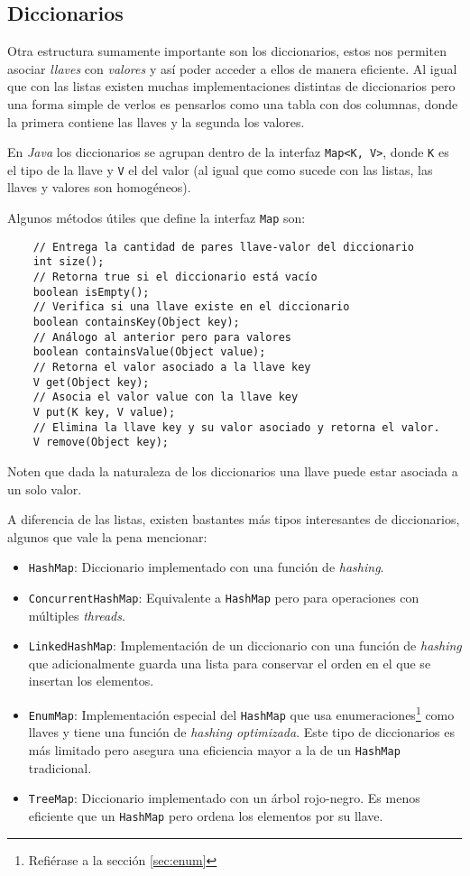 \subsection{Diccionarios}
  Otra estructura sumamente importante son los diccionarios, estos nos permiten asociar 
  \textit{llaves} con \textit{valores} y así poder acceder a ellos de manera eficiente.
  Al igual que con las listas existen muchas implementaciones distintas de diccionarios pero una
  forma simple de verlos es pensarlos como una tabla con dos columnas, donde la primera contiene las
  llaves y la segunda los valores.

  En \textit{Java} los diccionarios se agrupan dentro de la interfaz \texttt{Map<K, V>},
  donde \texttt{K} es el tipo de la llave y \texttt{V} el del valor (al igual que como sucede con 
  las listas, las llaves y valores son homogéneos).

  Algunos métodos útiles que define la interfaz \texttt{Map} son:
  \begin{verbatim}
    // Entrega la cantidad de pares llave-valor del diccionario
    int size();
    // Retorna true si el diccionario está vacío
    boolean isEmpty();
    // Verifica si una llave existe en el diccionario
    boolean containsKey(Object key);
    // Análogo al anterior pero para valores
    boolean containsValue(Object value);
    // Retorna el valor asociado a la llave key
    V get(Object key);
    // Asocia el valor value con la llave key
    V put(K key, V value);
    // Elimina la llave key y su valor asociado y retorna el valor.
    V remove(Object key);
  \end{verbatim}

  Noten que dada la naturaleza de los diccionarios una llave puede estar asociada a un solo valor.

  A diferencia de las listas, existen bastantes más tipos interesantes de diccionarios, algunos que
  vale la pena mencionar:
  \begin{itemize}
    \item \texttt{HashMap}: Diccionario implementado con una función de \textit{hashing}.
    \item \texttt{ConcurrentHashMap}: Equivalente a \texttt{HashMap} pero para operaciones con 
      múltiples \textit{threads}.
    \item \texttt{LinkedHashMap}: Implementación de un diccionario con una función de 
      \textit{hashing} que adicionalmente guarda una lista para conservar el orden en el que se 
      insertan los elementos.
    \item \texttt{EnumMap}: Implementación especial del \texttt{HashMap} que usa 
      enumeraciones\footnote{Refiérase a la sección \ref{sec:enum}} como llaves y tiene una función 
      de \textit{hashing optimizada}.
      Este tipo de diccionarios es más limitado pero asegura una eficiencia mayor a la de un 
      \texttt{HashMap} tradicional.
    \item \texttt{TreeMap}: Diccionario implementado con un árbol rojo-negro.
      Es menos eficiente que un \texttt{HashMap} pero ordena los elementos por su llave.
  \end{itemize}